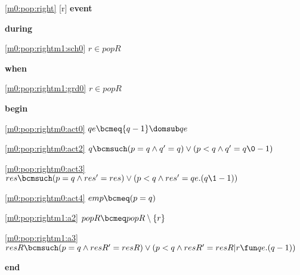 \noindent \ref{m0:pop:right} [r] \textbf{event}
\begin{block}
  \item   \textbf{during}
  \begin{block}
  \item[ \eqref{m0:pop:rightm1:sch0} ]$r \in popR $ %
  \end{block}
  \item   \textbf{when}
  \begin{block}
  \item[ \eqref{m0:pop:rightm1:grd0} ]$r \in popR $ %
  \end{block}
  \item   \textbf{begin}
  \begin{block}
  \item[ \eqref{m0:pop:rightm0:act0} ]$qe \bcmeq \{ q-1 \} \domsub qe $ %
  \item[ \eqref{m0:pop:rightm0:act2} ]$q \bcmsuch (p = q \land q' = q) \lor (p < q \land q' = q\0-1) $ %
  \item[ \eqref{m0:pop:rightm0:act3} ]$res \bcmsuch (p = q \land res' = res) \lor (p < q \land res' = qe.(q\1-1)) $ %
  \item[ \eqref{m0:pop:rightm0:act4} ]$emp \bcmeq (p = q) $ %
  \item[ \eqref{m0:pop:rightm1:a2} ]$popR \bcmeq popR \setminus \{ r \} $ %
  \item[ \eqref{m0:pop:rightm1:a3} ]$resR \bcmsuch (p = q \land resR' = resR)  %
  	\lor (p < q \land resR' = resR | r \fun qe.(q-1) ) $ %
  \end{block}
  \item   \textbf{end} \\
\end{block}
